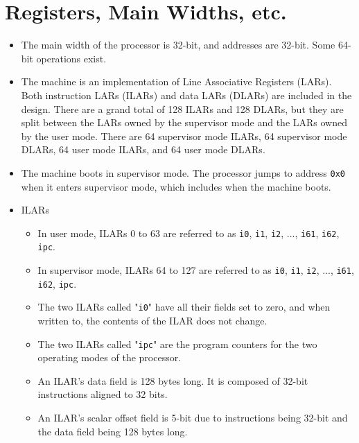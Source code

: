 \documentclass{article}
\begin{document}
\section{Registers, Main Widths, etc.}
	\begin{itemize}
	\item The main width of the processor is 32-bit, and addresses are
	32-bit.  Some 64-bit operations exist.

	\item The machine is an implementation of Line Associative Registers
	(LARs).  Both instruction LARs (ILARs) and data LARs (DLARs) are
	included in the design.  There are a grand total of 128 ILARs and 128
	DLARs, but they are split between the LARs owned by the supervisor
	mode and the LARs owned by the user mode.  There are 64 supervisor mode
	ILARs, 64 supervisor mode DLARs, 64 user mode ILARs, and 64 user mode
	DLARs.

	\item The machine boots in supervisor mode.  The processor jumps to
	address \texttt{0x0} when it enters supervisor mode, which includes
	when the machine boots.

	\item ILARs
		\begin{itemize}
		\item In user mode, ILARs 0 to 63 are referred to as \texttt{i0},
		\texttt{i1}, \texttt{i2}, ..., \texttt{i61}, \texttt{i62},
		\texttt{ipc}.

		\item In supervisor mode, ILARs 64 to 127 are referred to as
		\texttt{i0}, \texttt{i1}, \texttt{i2}, ..., \texttt{i61},
		\texttt{i62}, \texttt{ipc}.

		\item The two ILARs called "\texttt{i0}" have all their
		fields set to zero, and when written to, the contents of the ILAR
		does not change.

		\item The two ILARs called "\texttt{ipc}" are the program
		counters for the two operating modes of the processor.

		\item An ILAR's data field is 128 bytes long.  It is composed of
		32-bit instructions aligned to 32 bits.

		\item An ILAR's scalar offset field is 5-bit due to instructions
		being 32-bit and the data field being 128 bytes long.


\end{itemize}
\end{itemize}
\end{document}

